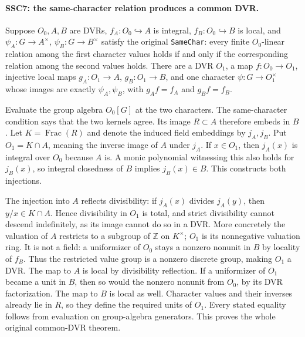 \paragraph{SSC7: the same-character relation produces a common DVR.}
\label{claim:SSC7}
Suppose $O_0,A,B$ are DVRs, $f_A:O_0\hookrightarrow A$ is
integral, $f_B:O_0\hookrightarrow B$ is local, and
$\psi_A:G\to A^\times$, $\psi_B:G\to B^\times$ satisfy the
original \texttt{SameChar}: every finite $O_0$-linear relation
among the first character values holds if and only if the
corresponding relation among the second values holds. There are a
DVR $O_1$, a map $f:O_0\to O_1$, injective local maps
$g_A:O_1\to A$, $g_B:O_1\to B$, and one character
$\psi:G\to O_1^\times$ whose images are exactly $\psi_A,\psi_B$,
with $g_Af=f_A$ and $g_Bf=f_B$.

Evaluate the group algebra $O_0[G]$ at the two characters. The
same-character condition says that the two kernels agree. Its
image $R\subset A$ therefore embeds in $B$. Let
$K=\operatorname{Frac}(R)$ and denote the induced field embeddings
by $j_A,j_B$. Put $O_1=K\cap A$, meaning the inverse image of $A$
under $j_A$. If $x\in O_1$, then $j_A(x)$ is integral over $O_0$
because $A$ is. A monic polynomial witnessing this also holds
for $j_B(x)$, so integral closedness of $B$ implies $j_B(x)\in B$.
This constructs both injections.

The injection into $A$ reflects divisibility: if $j_A(x)$ divides
$j_A(y)$, then $y/x\in K\cap A$. Hence divisibility in $O_1$
is total, and strict divisibility cannot descend indefinitely,
as its image cannot do so in a DVR. More concretely the valuation
of $A$ restricts to a subgroup of $\mathbb Z$ on $K^\times$;
$O_1$ is its nonnegative valuation ring. It is not a field:
a uniformizer of $O_0$ stays a nonzero nonunit in $B$ by locality
of $f_B$. Thus the restricted value group is a nonzero discrete
group, making $O_1$ a DVR. The map to $A$ is local by divisibility
reflection. If a uniformizer of $O_1$ became a unit in $B$, then
so would the nonzero nonunit from $O_0$, by its DVR factorization.
The map to $B$ is local as well. Character values and their inverses
already lie in $R$, so they define the required units of $O_1$.
Every stated equality follows from evaluation on group-algebra
generators. This proves the whole original common-DVR theorem.

